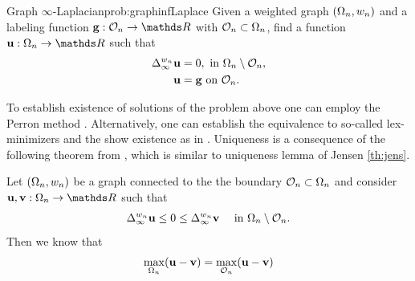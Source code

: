 \begin{problem}{Graph $\infty$-Laplacian}{prob:graphinfLaplace}
Given a weighted graph $(\Omega_n, w_n)$ and a labeling function $\vec g:\conset_n\to\R$ with $\mathcal{O}_n\subset\Omega_n$, find 
a function $\vec u:\domain_n\to\R$ such that
%
\begin{align*}
\Delta_\infty^{w_n} \mathbf{u} &= 0, \text{ in } \Omega_n\setminus \mathcal{O}_n,\\
\mathbf{u} &= \mathbf{g} \text{ on } \mathcal{O}_n.
\end{align*}
\end{problem}
%
%
\noindent%
To establish existence of solutions of the problem above one can employ the Perron method \cite{perron1923neue}. Alternatively, one can establish the equivalence to so-called lex-minimizers and the show existence as in \cite[Th. 3.3]{kyng2015algorithms}. Uniqueness is a consequence of the following theorem from \cite{calder2019consistency}, which is similar to uniqueness lemma of Jensen \cref{th:jens}.
%
\begin{theorem}{\cite[Th. 3.1]{calder2019consistency}}{}
Let $(\Omega_n,w_n)$ be a graph connected to the the boundary $\mathcal{O}_n\subset\Omega_n$ and consider $\vec u,\vec v:\domain_n\to\R$ such that
%
\begin{align*}
\Delta^{w_n}_\infty \mathbf{u} \leq 0 \leq \Delta^{w_n}_\infty \mathbf{v}
\quad\text{ in } \Omega_n\setminus\mathcal{O}_n.
\end{align*}
%
Then we know that
%
\begin{align*}
\max_{\Omega_n} (\mathbf{u} - \mathbf{v}) = \max_{\mathcal{O}_n} (\mathbf{u} - \mathbf{v})
\end{align*}
\end{theorem}
%
%
